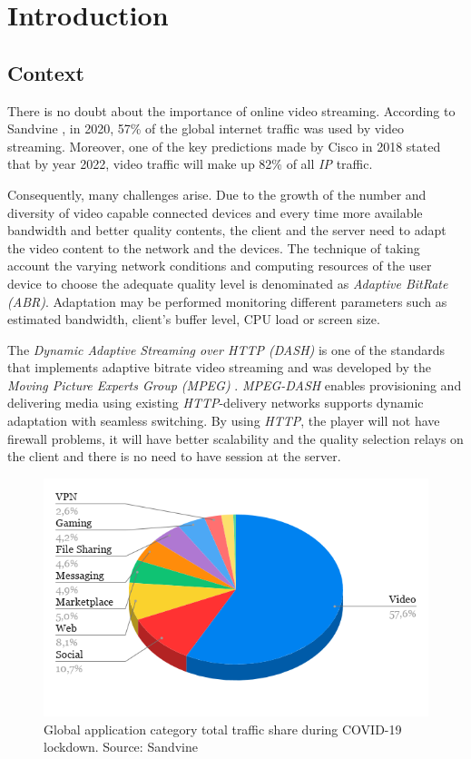 \chapter{Introduction}
\label{chap:introduction}

\section{Context}
\label{sec:context}

There is no doubt about the importance of online video streaming.
According to Sandvine \cite{sandvine1},
in 2020, 57\% of the global internet traffic was used by video streaming.
Moreover, one of the key predictions made by Cisco in 2018 \cite{cisco1}
stated that by year 2022, video traffic will make up 82\% 
of all \textit{IP} traffic.

Consequently, many challenges arise. Due to the
growth of the number and diversity of video capable connected 
devices and every time more available bandwidth and better quality 
contents, the client and the server need to adapt the video content to
the network and the devices. The technique of taking account the 
varying network conditions and computing resources of the user 
device to choose the adequate quality level is denominated as
\textit{Adaptive BitRate (ABR)}. Adaptation may be performed
monitoring different parameters such as estimated bandwidth,
client's buffer level, CPU load or screen size.

The \textit{Dynamic Adaptive Streaming over HTTP (DASH)} is one of the
standards that implements adaptive bitrate video streaming and was developed
by the \textit{Moving Picture Experts Group (MPEG)} \cite{dash1}. \textit{MPEG-DASH} 
enables provisioning and delivering media using existing \textit{HTTP}-delivery 
networks supports dynamic adaptation with seamless switching. By using
\textit{HTTP}, the player will not have firewall problems, it will have better
scalability and the quality selection relays on the client and there is no
need to have session at the server.


\begin{figure}[h]
\label{fig:chart1}
  \centering
  \includegraphics[width=\textwidth]{img/chart1.png}
  \caption{Global application category total traffic share during COVID-19 lockdown. Source: Sandvine \cite{sandvine1}}
\end{figure}

